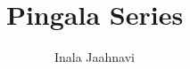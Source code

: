 \documentclass[journal,12pt,twocolumn]{IEEEtran}
\begin{document}
\makeatletter
{}
\makeatother
\let\StandardTheFigure\thefigure
\renewcommand{\thefigure}{\theproblem}
\def\putbox#1#2#3{\makebox[0in][l]{\makebox[#1][l]{}\raisebox{\baselineskip}[0in][0in]{\raisebox{#2}[0in][0in]{#3}}}}
     \def\rightbox#1{\makebox[0in][r]{#1}}
     \def\centbox#1{\makebox[0in]{#1}}
     \def\topbox#1{\raisebox{-\baselineskip}[0in][0in]{#1}}
     \def\midbox#1{\raisebox{-0.5\baselineskip}[0in][0in]{#1}}
\vspace{3cm}
\title{ 
Pingala Series
}
%
%
%
\author{ Inala Jaahnavi }
\end{document}
